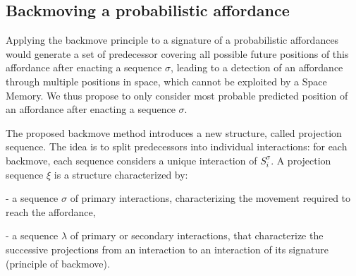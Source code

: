 \documentclass[conference]{IEEEtran}
\begin{document}
\subsection{Backmoving a probabilistic affordance}

Applying the backmove principle to a signature of a probabilistic affordances would generate a set of predecessor covering all possible future positions of this affordance after enacting a sequence $\sigma$, leading to a detection of an affordance through multiple positions in space, which
cannot be exploited by a Space Memory.
We thus propose to only consider most probable predicted position of an affordance after enacting a sequence $\sigma$.

The proposed backmove method introduces a new structure, called projection sequence. The idea is to split predecessors into individual interactions: for each backmove, each sequence considers a unique interaction of $S_i^{\sigma}$.
A projection sequence $\xi$ is a structure characterized by:

- a sequence $\sigma$ of primary interactions, characterizing the movement required to reach the affordance,

- a sequence $\lambda$ of primary or secondary interactions, that characterize the successive projections from an interaction to an interaction of its signature (principle of backmove).
\end{document}
